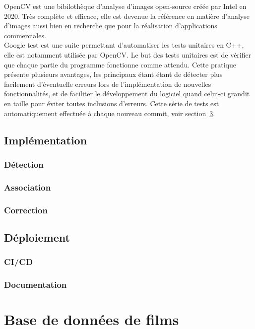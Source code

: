 	OpenCV est une bibilothèque d'analyse d'images open-source créée par Intel en 2020. Très complète et efficace, elle est devenue la référence en matière d'analyse d'images aussi bien en recherche que pour la réalisation d'applications commerciales.\\
	
	Google test est une suite permettant d'automatiser les tests unitaires en C++, elle est notamment utilisée par OpenCV. Le but des tests unitaires est de vérifier que chaque partie du programme fonctionne comme attendu. Cette pratique présente plusieurs avantages, les principaux étant étant de détecter plus facilement d'éventuelle erreurs lors de l'implémentation de nouvelles fonctionnalités, et de faciliter le développement du logiciel quand celui-ci grandit en taille pour éviter toutes inclusions d'erreurs. Cette série de tests est automatiquement effectuée à chaque nouveau commit, voir section~\ref{}.
	
	\section{Implémentation}
		\subsection{Détection}
		\subsection{Association}
		\subsection{Correction}
		
	\section{Déploiement}
		\subsection{CI/CD}
		\subsection{Documentation}

		
\chapter{Base de données de films}


